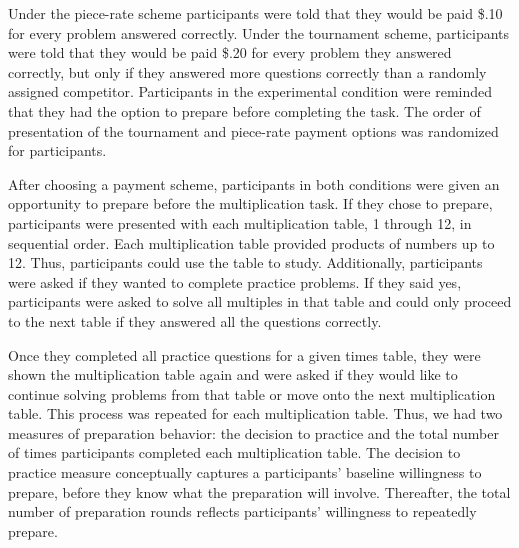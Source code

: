 \documentclass[a4paper, nobind]{templates/ociamthesis}
\begin{document}
Under the piece-rate scheme participants were told that they would be paid \$.10 for every problem answered correctly. Under the tournament scheme, participants were told that they would be paid \$.20 for every problem they answered correctly, but only if they answered more questions correctly than a randomly assigned competitor. Participants in the experimental condition were reminded that they had the option to prepare before completing the task. The order of presentation of the tournament and piece-rate payment options was randomized for participants.

After choosing a payment scheme, participants in both conditions were given an opportunity to prepare before the multiplication task. If they chose to prepare, participants were presented with each multiplication table, 1 through 12, in sequential order. Each multiplication table provided products of numbers up to 12. Thus, participants could use the table to study. Additionally, participants were asked if they wanted to complete practice problems. If they said yes, participants were asked to solve all multiples in that table and could only proceed to the next table if they answered all the questions correctly.

Once they completed all practice questions for a given times table, they were shown the multiplication table again and were asked if they would like to continue solving problems from that table or move onto the next multiplication table. This process was repeated for each multiplication table. Thus, we had two measures of preparation behavior: the decision to practice and the total number of times participants completed each multiplication table. The decision to practice measure conceptually captures a participants' baseline willingness to prepare, before they know what the preparation will involve. Thereafter, the total number of preparation rounds reflects participants' willingness to repeatedly prepare.
\end{document}
